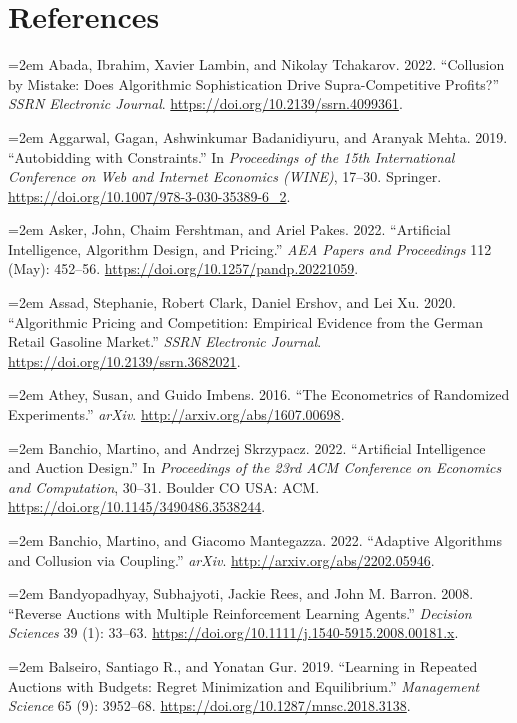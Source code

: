 \section{References}

\begingroup
\setlength{\parindent}{0pt}
\setlength{\parskip}{0.5\baselineskip}
\setlength{\hangindent}{2em}

\hangindent=2em Abada, Ibrahim, Xavier Lambin, and Nikolay Tchakarov. 2022. ``Collusion by Mistake: Does Algorithmic Sophistication Drive Supra-Competitive Profits?'' \textit{SSRN Electronic Journal}. \url{https://doi.org/10.2139/ssrn.4099361}.

\hangindent=2em Aggarwal, Gagan, Ashwinkumar Badanidiyuru, and Aranyak Mehta. 2019. ``Autobidding with Constraints.'' In \textit{Proceedings of the 15th International Conference on Web and Internet Economics (WINE)}, 17--30. Springer. \url{https://doi.org/10.1007/978-3-030-35389-6_2}.

\hangindent=2em Asker, John, Chaim Fershtman, and Ariel Pakes. 2022. ``Artificial Intelligence, Algorithm Design, and Pricing.'' \textit{AEA Papers and Proceedings} 112 (May): 452--56. \url{https://doi.org/10.1257/pandp.20221059}.

\hangindent=2em Assad, Stephanie, Robert Clark, Daniel Ershov, and Lei Xu. 2020. ``Algorithmic Pricing and Competition: Empirical Evidence from the German Retail Gasoline Market.'' \textit{SSRN Electronic Journal}. \url{https://doi.org/10.2139/ssrn.3682021}.

\hangindent=2em Athey, Susan, and Guido Imbens. 2016. ``The Econometrics of Randomized Experiments.'' \textit{arXiv}. \url{http://arxiv.org/abs/1607.00698}.

\hangindent=2em Banchio, Martino, and Andrzej Skrzypacz. 2022. ``Artificial Intelligence and Auction Design.'' In \textit{Proceedings of the 23rd ACM Conference on Economics and Computation}, 30--31. Boulder CO USA: ACM. \url{https://doi.org/10.1145/3490486.3538244}.

\hangindent=2em Banchio, Martino, and Giacomo Mantegazza. 2022. ``Adaptive Algorithms and Collusion via Coupling.'' \textit{arXiv}. \url{http://arxiv.org/abs/2202.05946}.

\hangindent=2em Bandyopadhyay, Subhajyoti, Jackie Rees, and John M. Barron. 2008. ``Reverse Auctions with Multiple Reinforcement Learning Agents.'' \textit{Decision Sciences} 39 (1): 33--63. \url{https://doi.org/10.1111/j.1540-5915.2008.00181.x}.

\hangindent=2em Balseiro, Santiago R., and Yonatan Gur. 2019. ``Learning in Repeated Auctions with Budgets: Regret Minimization and Equilibrium.'' \textit{Management Science} 65 (9): 3952--68. \url{https://doi.org/10.1287/mnsc.2018.3138}.

